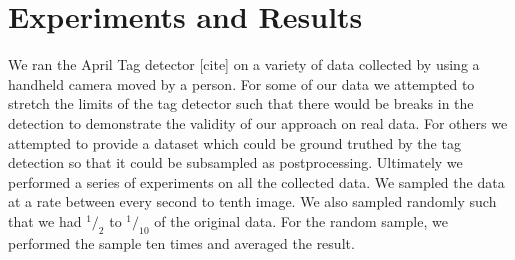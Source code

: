 \documentclass[12pt]{article}
\begin{document}
\section{Experiments and Results}
\label{sec:results}
We ran the April Tag detector [cite] on a variety of data collected by using a handheld camera moved by a person.  For some of our data we attempted to stretch the limits of the tag detector such that there would be breaks in the detection to demonstrate the validity of our approach on real data.  For others we attempted to provide a dataset which could be ground truthed by the tag detection so that it could be subsampled as postprocessing.  Ultimately we performed a series of experiments on all the collected data.  We sampled the data at a rate between every second to tenth image.  We also sampled randomly such that we had $^1/_2$ to $^1/_{10}$ of the original data.  For the random sample, we performed the sample ten times and averaged the result.
\end{document}
